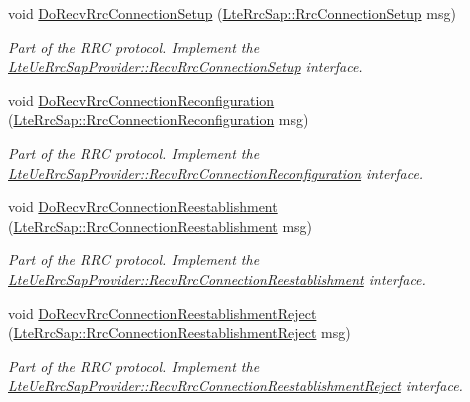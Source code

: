 \begin{DoxyCompactItemize}
void \hyperlink{classns3_1_1LteUeRrc_a3cfc766a9d059c1102ef7c2562dccdc9}{Do\+Recv\+Rrc\+Connection\+Setup} (\hyperlink{structns3_1_1LteRrcSap_1_1RrcConnectionSetup}{Lte\+Rrc\+Sap\+::\+Rrc\+Connection\+Setup} msg)
\begin{DoxyCompactList}\small\item\em Part of the R\+RC protocol. Implement the \hyperlink{classns3_1_1LteUeRrcSapProvider_aad40c881f56b67a46fed66e19e7e6ab0}{Lte\+Ue\+Rrc\+Sap\+Provider\+::\+Recv\+Rrc\+Connection\+Setup} interface. \end{DoxyCompactList}\item 
void \hyperlink{classns3_1_1LteUeRrc_a010d1adc54671f4a4801ff1c0e831f15}{Do\+Recv\+Rrc\+Connection\+Reconfiguration} (\hyperlink{structns3_1_1LteRrcSap_1_1RrcConnectionReconfiguration}{Lte\+Rrc\+Sap\+::\+Rrc\+Connection\+Reconfiguration} msg)
\begin{DoxyCompactList}\small\item\em Part of the R\+RC protocol. Implement the \hyperlink{classns3_1_1LteUeRrcSapProvider_a16f321a91134b1597bcf3a9e85eba39d}{Lte\+Ue\+Rrc\+Sap\+Provider\+::\+Recv\+Rrc\+Connection\+Reconfiguration} interface. \end{DoxyCompactList}\item 
void \hyperlink{classns3_1_1LteUeRrc_a413ac63152027ed925cedcf714ec8207}{Do\+Recv\+Rrc\+Connection\+Reestablishment} (\hyperlink{structns3_1_1LteRrcSap_1_1RrcConnectionReestablishment}{Lte\+Rrc\+Sap\+::\+Rrc\+Connection\+Reestablishment} msg)
\begin{DoxyCompactList}\small\item\em Part of the R\+RC protocol. Implement the \hyperlink{classns3_1_1LteUeRrcSapProvider_ad9a7cb57c2dda4aade5d2a6a1f36c414}{Lte\+Ue\+Rrc\+Sap\+Provider\+::\+Recv\+Rrc\+Connection\+Reestablishment} interface. \end{DoxyCompactList}\item 
void \hyperlink{classns3_1_1LteUeRrc_a3428349639bbd4887aa543fcbd5152a4}{Do\+Recv\+Rrc\+Connection\+Reestablishment\+Reject} (\hyperlink{structns3_1_1LteRrcSap_1_1RrcConnectionReestablishmentReject}{Lte\+Rrc\+Sap\+::\+Rrc\+Connection\+Reestablishment\+Reject} msg)
\begin{DoxyCompactList}\small\item\em Part of the R\+RC protocol. Implement the \hyperlink{classns3_1_1LteUeRrcSapProvider_a77a9855e3a2613a51abd65d5bacc759f}{Lte\+Ue\+Rrc\+Sap\+Provider\+::\+Recv\+Rrc\+Connection\+Reestablishment\+Reject} interface. \end{DoxyCompactList}\item 

\end{DoxyCompactItemize}
